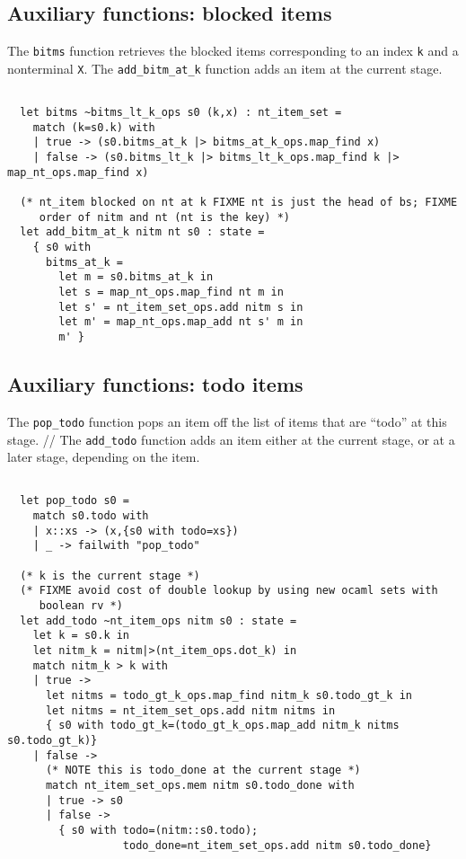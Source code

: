 \documentclass[]{article}
\begin{document}
\begin{multicols}{2}
\subsection{Auxiliary functions: blocked items}

The \texttt{bitms} function retrieves the blocked items corresponding to
an index \texttt{k} and a nonterminal \texttt{X}. The
\texttt{add\_bitm\_at\_k} function adds an item at the current stage.

\begin{verbatim}

  let bitms ~bitms_lt_k_ops s0 (k,x) : nt_item_set = 
    match (k=s0.k) with
    | true -> (s0.bitms_at_k |> bitms_at_k_ops.map_find x)
    | false -> (s0.bitms_lt_k |> bitms_lt_k_ops.map_find k |> map_nt_ops.map_find x)

  (* nt_item blocked on nt at k FIXME nt is just the head of bs; FIXME
     order of nitm and nt (nt is the key) *)
  let add_bitm_at_k nitm nt s0 : state = 
    { s0 with
      bitms_at_k =
        let m = s0.bitms_at_k in
        let s = map_nt_ops.map_find nt m in
        let s' = nt_item_set_ops.add nitm s in
        let m' = map_nt_ops.map_add nt s' m in
        m' }

\end{verbatim}

\subsection{Auxiliary functions: todo items}

The \texttt{pop\_todo} function pops an item off the list of items that
are ``todo'' at this stage. // The \texttt{add\_todo} function adds an
item either at the current stage, or at a later stage, depending on the
item.

\begin{verbatim}

  let pop_todo s0 =
    match s0.todo with
    | x::xs -> (x,{s0 with todo=xs})
    | _ -> failwith "pop_todo"

  (* k is the current stage *)
  (* FIXME avoid cost of double lookup by using new ocaml sets with
     boolean rv *)
  let add_todo ~nt_item_ops nitm s0 : state = 
    let k = s0.k in
    let nitm_k = nitm|>(nt_item_ops.dot_k) in
    match nitm_k > k with
    | true -> 
      let nitms = todo_gt_k_ops.map_find nitm_k s0.todo_gt_k in
      let nitms = nt_item_set_ops.add nitm nitms in
      { s0 with todo_gt_k=(todo_gt_k_ops.map_add nitm_k nitms s0.todo_gt_k)}
    | false -> 
      (* NOTE this is todo_done at the current stage *)
      match nt_item_set_ops.mem nitm s0.todo_done with
      | true -> s0
      | false -> 
        { s0 with todo=(nitm::s0.todo);
                  todo_done=nt_item_set_ops.add nitm s0.todo_done}


\end{verbatim}
\end{multicols}
\end{document}
